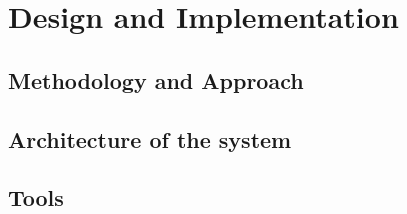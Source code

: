 \chapter{Design and Implementation}
\section{Methodology and Approach}
\section{Architecture of the system}
\section{Tools}
